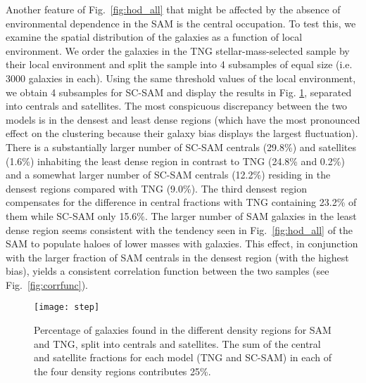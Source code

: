 \documentclass[fleqn,usenatbib]{mnras}
\newcommand{\rss}[1]{\textcolor{purple}{(rss: #1)}}
\begin{document}
Another feature of Fig.~\ref{fig:hod_all} that might be affected by the absence of environmental dependence in the SAM is the central occupation. To test this, we examine the spatial distribution of the galaxies as a function of local environment. We order the galaxies in the TNG stellar-mass-selected sample by their local environment and split the sample into 4 subsamples of equal size (i.e. 3000 galaxies in each). Using the same threshold values of the local environment, we obtain 4 subsamples for SC-SAM and display the results in Fig. \ref{fig:step}, separated into centrals and satellites.
The most conspicuous discrepancy between the two models is in the densest and least dense regions (which have the most pronounced effect on the clustering because their galaxy bias displays the largest fluctuation). There is a substantially larger number of SC-SAM centrals (29.8\%) and satellites (1.6\%) inhabiting the least dense region in contrast to TNG (24.8\% and 0.2\%) and a somewhat larger number of SC-SAM centrals (12.2\%) residing in the densest regions compared with TNG (9.0\%). The third densest region compensates for the difference in central fractions with TNG containing 23.2\% of them while SC-SAM only 15.6\%.
The larger number of SAM galaxies in the least dense region seems consistent with the tendency seen in Fig.~\ref{fig:hod_all} of the SAM to populate haloes of lower masses with galaxies. This effect, in conjunction with the larger fraction of SAM centrals in the densest region (with the highest bias), yields a consistent correlation function between the two samples (see Fig.~\ref{fig:corrfunc}). 

\begin{figure}
\centering  
\texttt{[image: step]}
\caption{Percentage of galaxies found in the different density regions for SAM and TNG, split into centrals and satellites. The sum of the central and satellite fractions for each model (TNG and SC-SAM) in each of the four density regions contributes 25\%.}
\label{fig:step}
\end{figure}
\end{document}
